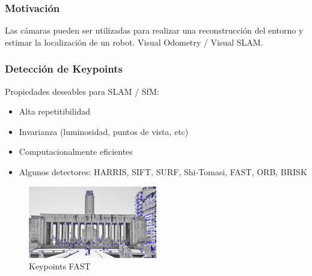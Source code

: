 \begin{frame}
    \frametitle{Motivación}
    
    Las cámaras pueden ser utilizadas para realizar una reconstrucción del entorno y estimar la localización de un robot. Visual Odometry / Visual SLAM.
    
    \begin{center}
    \end{center}
    
\end{frame}

\begin{frame}
    \frametitle{Detección de Keypoints}
    
    
    
    \footnotesize
    Propiedades deseables para SLAM / SfM:
    \begin{itemize}
        \item Alta repetitibilidad
        \item Invarianza (luminosidad, puntos de vista, etc)
        \item Computacionalmente eficientes
        \item Algunos detectores: HARRIS, SIFT, SURF, Shi-Tomasi, FAST, ORB, BRISK
    \end{itemize}

    
    \begin{figure}
        \includegraphics[width=0.5\textwidth]{./images/keypoints_fast}
        \caption{Keypoints FAST}
    \end{figure}

\end{frame}


